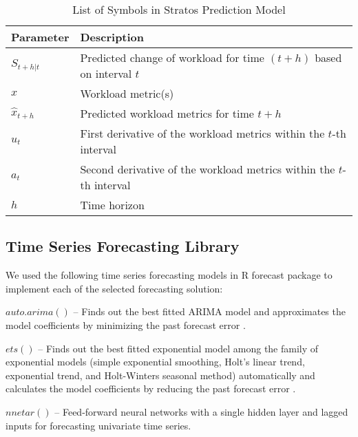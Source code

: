 \begin{table}[]
\centering
\caption{List of Symbols in Stratos Prediction Model}
\begin{tabular}{ll}
\hline
Parameter       & Description                                                                     \\ \hline
$S_{t+h|t}$     & Predicted change of workload for time $(t+h)$ based on interval $t$ \\
$x$             & Workload metric(s)                                                                \\ \hline
$\hat{x}_{t+h}$ & Predicted workload metrics for time $t+h$                                       \\ \hline
$u_{t}$         & First derivative of the workload metrics within the $t$-th interval           \\ \hline
$a_{t}$         & Second derivative of the workload metrics within the $t$-th interval          \\ \hline
$h$             & Time horizon                    
\end{tabular}
\end{table}

\subsection{Time Series Forecasting Library}

We used the following time series forecasting models in R forecast package \cite{forecastPackage} to implement each of the selected forecasting solution:

\noindent
$auto.arima()$ -- Finds out the best fitted ARIMA model and approximates the model coefficients by minimizing the past forecast error \cite{Forecasting_OTexts}.

\noindent
$ets()$ -- Finds out the best fitted exponential model among the family of exponential models (simple exponential smoothing, Holt's linear trend, exponential trend, and Holt-Winters seasonal method) automatically and calculates the model coefficients by reducing the past forecast error \cite{Forecasting_OTexts}.

\noindent
$nnetar()$ -- Feed-forward neural networks with a single hidden layer and lagged inputs for forecasting univariate time series.